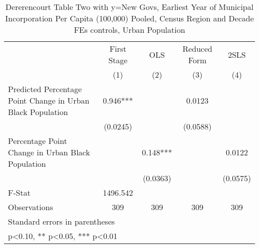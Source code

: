 \begin{table}[htbp]\centering
\def\sym#1{\ifmmode^{#1}\else\(^{#1}\)\fi}
\caption{Dererencourt Table Two with y=New Govs, Earliest Year of Municipal Incorporation Per Capita (100,000) Pooled, Census Region and Decade FEs controls, Urban Population}
\begin{tabular}{l*{4}{c}}
\toprule
                    & First Stage   &         OLS   &Reduced Form   &        2SLS   \\
                    &\multicolumn{1}{c}{(1)}   &\multicolumn{1}{c}{(2)}   &\multicolumn{1}{c}{(3)}   &\multicolumn{1}{c}{(4)}   \\
\midrule
Predicted Percentage Point Change in Urban Black Population&       0.946***&               &      0.0123   &               \\
                    &    (0.0245)   &               &    (0.0588)   &               \\
\addlinespace
Percentage Point Change in Urban Black Population&               &       0.148***&               &      0.0122   \\
                    &               &    (0.0363)   &               &    (0.0575)   \\
\midrule
F-Stat              &    1496.542   &               &               &               \\
Observations        &         309   &         309   &         309   &         309   \\
\bottomrule
\multicolumn{5}{l}{\footnotesize Standard errors in parentheses}\\
\multicolumn{5}{l}{\footnotesize * p<0.10, ** p<0.05, *** p<0.01}\\
\end{tabular}
\end{table}

